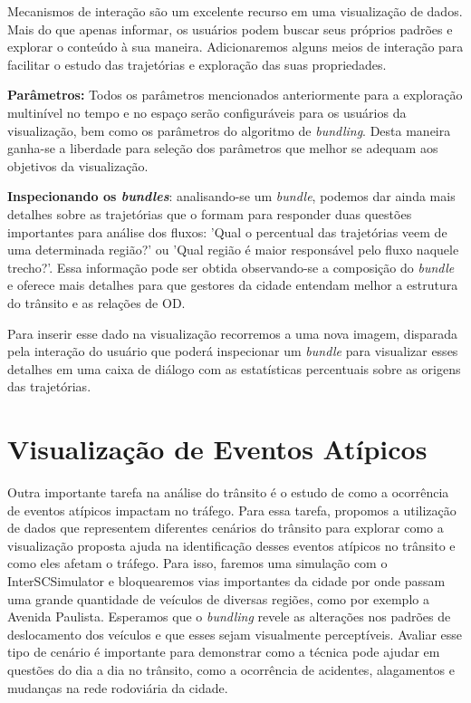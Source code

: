 Mecanismos de interação são um excelente recurso em uma visualização de dados.
Mais do que apenas informar, os usuários podem buscar seus próprios padrões e
explorar o conteúdo à sua maneira. Adicionaremos alguns meios de interação para
facilitar o estudo das trajetórias e exploração das suas propriedades.
 
\textbf{Parâmetros:} Todos os parâmetros mencionados anteriormente para a exploração
multinível no tempo e no espaço serão configuráveis para os usuários da visualização,
bem como os parâmetros do algoritmo de \emph{bundling}. Desta maneira ganha-se
a liberdade para seleção dos parâmetros que melhor se adequam aos objetivos
da visualização.

\textbf{Inspecionando os \emph{bundles}}: analisando-se um \emph{bundle},
podemos dar ainda mais detalhes sobre as trajetórias que o formam para
responder duas questões importantes para análise dos fluxos: 'Qual o percentual
das trajetórias veem de uma determinada região?' ou 'Qual região é maior
responsável pelo fluxo naquele trecho?'.  Essa informação pode ser obtida
observando-se a composição do \emph{bundle} e oferece mais detalhes para que
gestores da cidade entendam melhor a estrutura do trânsito e as relações de OD.

 Para inserir esse dado na visualização recorremos a uma nova
imagem, disparada pela interação do usuário que poderá inspecionar um
\emph{bundle} para visualizar esses detalhes em uma caixa de diálogo com as
estatísticas percentuais sobre as origens das trajetórias.

\section{Visualização de Eventos Atípicos}

  Outra importante tarefa na análise do trânsito é o estudo de como a
ocorrência de eventos atípicos impactam no tráfego. Para essa tarefa, propomos
a utilização de dados que representem diferentes cenários do trânsito para
explorar como a visualização proposta ajuda na identificação desses eventos
atípicos no trânsito e como eles afetam o tráfego. Para isso, faremos uma
simulação com o InterSCSimulator e bloquearemos vias importantes da cidade por
onde passam uma grande quantidade de veículos de diversas regiões, como por
exemplo a Avenida Paulista. Esperamos que o \emph{bundling} revele as alterações nos
padrões de deslocamento dos veículos e que esses sejam visualmente
perceptíveis. Avaliar esse tipo de cenário é importante para demonstrar como a
técnica pode ajudar em questões do dia a dia no trânsito, como a ocorrência de
acidentes, alagamentos e mudanças na rede rodoviária da cidade.

